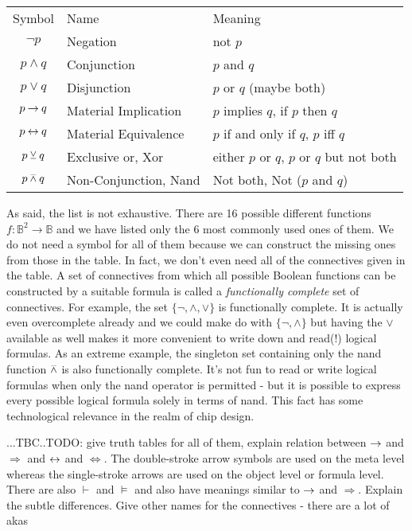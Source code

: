 \medskip
\begin{tabular}{c l l}
\label{Tab:LogicConnectives}
  Symbol           & Name                  & Meaning      \\
  $\neg p$         & Negation              & not $p$       \\
  $p \wedge q$     & Conjunction           & $p$ and $q$    \\
  $p \vee q$       & Disjunction           & $p$ or $q$ (maybe both)   \\
  $p \mathbin{\rightarrow} q$      & Material Implication  & $p$ implies $q$, if $p$ then $q$   \\  
  $p \mathbin{\leftrightarrow} q$    & Material Equivalence  & $p$ if and only if $q$, $p$ iff $q$   \\    
  $p \mathbin{\veebar} q$       & Exclusive or, Xor     & either $p$ or $q$, $p$ or $q$ but not both   \\ 
  $p \mathbin{\barwedge} q$      & Non-Conjunction, Nand & Not both, Not ($p$ and $q$)   \\   
\end{tabular}
\medskip

As said, the list is not exhaustive. There are 16 possible different functions $f: \mathbb{B}^2 \rightarrow \mathbb{B}$ and we have listed only the $6$ most commonly used ones of them. We do not need a symbol for all of them because we can construct the missing ones from those in the table. In fact, we don't even need all of the connectives given in the table. A set of connectives from which all possible Boolean functions can be constructed by a suitable formula is called a \emph{functionally complete} set of connectives. For example, the set $\{\neg, \wedge, \vee\}$ is functionally complete. It is actually even overcomplete already and we could make do with  $\{\neg, \wedge\}$ but having the $\vee$ available as well makes it more convenient to write down and read(!) logical formulas. As an extreme example, the singleton set containing only the nand function $\mathbin{\barwedge}$ is also functionally complete. It's not fun to read or write logical formulas when only the nand operator is permitted - but it is possible to express every possible logical formula solely in terms of nand. This fact has some technological relevance in the realm of chip design.

...TBC..TODO: give truth tables for all of them, explain relation between $\mathbin{\rightarrow}$ and $\Rightarrow$ and $\mathbin{\leftrightarrow}$ and $\Leftrightarrow$. The double-stroke arrow symbols are used on the meta level whereas the single-stroke arrows are used on the object level or formula level. There are also $\vdash$ and $\vDash$ and also have meanings similar to $\mathbin{\rightarrow}$ and $\Rightarrow$. Explain the subtle differences. Give other names for the connectives - there are a lot of akas

